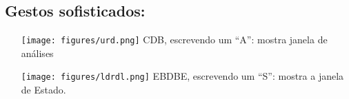 \subsection*{Gestos sofisticados:}
\begin{itemize}
\item[\raisebox{-1em}
{\texttt{[image: figures/urd.png]}}] CDB, escrevendo um “A”: mostra janela de análises
\item[\raisebox{-1em}
{\texttt{[image: figures/ldrdl.png]}}]EBDBE, escrevendo um “S”: mostra a janela de Estado. 
\end{itemize}
